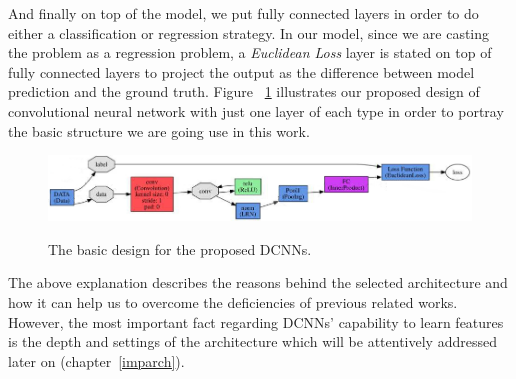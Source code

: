 And finally on top of the model, we put fully connected layers in order to do either a classification or regression strategy. In our model, since we are casting the problem as a regression problem, a \textit{Euclidean Loss} layer is stated on top of fully connected layers to project the output as the difference between model prediction and the ground truth. Figure ~\ref{fig:proposenet} illustrates our proposed design of convolutional neural network with just one layer of each type in order to portray the basic structure we are going use in this work. 

\begin{figure}[H]
	\centering
	{\includegraphics[width=1\textwidth]{images/dcnn}}
	\caption{The basic design for the proposed DCNNs.}
	\label{fig:proposenet}
\end{figure}

The above explanation describes the reasons behind the selected architecture and how it can help us to overcome the deficiencies of previous related works. However, the most important fact regarding DCNNs' capability to learn features is the depth and settings of the architecture which will be attentively addressed later on (chapter~\ref{imparch}).  